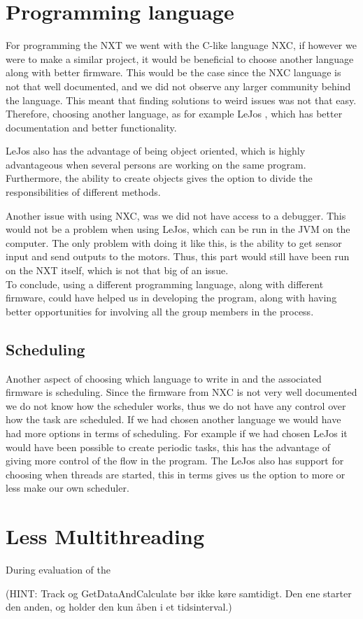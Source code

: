 \section{Programming language}
For programming the NXT we went with the C-like language NXC, if however we were
to make a similar project, it would be beneficial to choose another language
along with better firmware. This would be the case since the NXC language is not
that well documented, and we did not observe any larger community behind
the language. This meant that finding solutions to weird issues was not that
easy. Therefore, choosing another language, as for example LeJos \cite{LeJos},
which has better documentation and better functionality. \nl

LeJos also has the advantage of being object oriented, which is highly
advantageous when several persons are working on the same program. Furthermore,
the ability to create objects gives the option to divide the responsibilities of
different methods.\nl

Another issue with using NXC, was we did not have access to a debugger. This
would not be a problem when using LeJos, which can be run in the JVM on the
computer. The only problem with doing it like this, is the ability to get sensor
input and send outputs to the motors. Thus, this part would still have been run
on the NXT itself, which is not that big of an issue.\\
To conclude, using a different programming language, along with different
firmware, could have helped us in developing the program, along with having
better opportunities for involving all the group members in the process.


\subsection{Scheduling}
Another aspect of choosing which language to write in and the associated
firmware is scheduling. Since the firmware from NXC is not very well documented
we do not know how the scheduler works, thus we do not have any control over how
the task are scheduled. If we had chosen another language we would have had more
options in terms of scheduling. For example if we had chosen LeJos it would have
been possible to create periodic tasks, this has the advantage of giving more
control of the flow in the program. The LeJos also has support for choosing when
threads are started, this in terms gives us the option to more or less make our
own scheduler. 


\section{Less Multithreading}
During evaluation of the 

(HINT: Track og GetDataAndCalculate bør ikke køre samtidigt. Den ene starter
  den anden, og holder den kun åben i et tidsinterval.)
